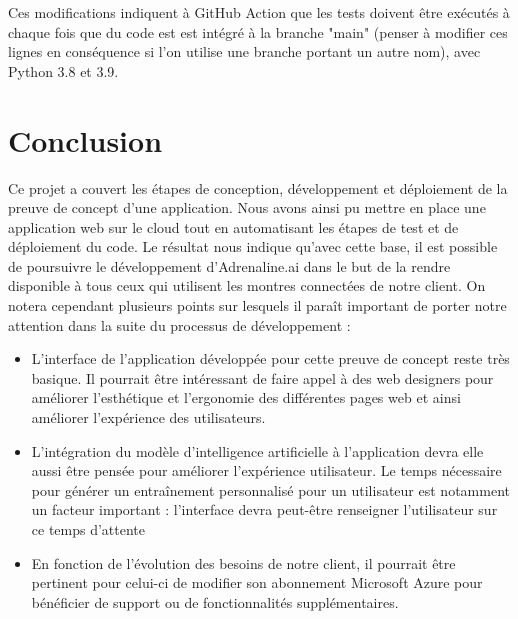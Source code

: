 \documentclass[french]{article}
\begin{document}
    Ces modifications indiquent à GitHub Action que les tests doivent être exécutés à chaque fois que du code est est intégré à la branche "main" (penser à modifier ces lignes en conséquence si l'on utilise une branche portant un autre nom), avec Python 3.8 et 3.9.




  

    \section*{Conclusion}
    Ce projet a couvert les étapes de conception, développement et déploiement de la preuve de concept d'une application. Nous avons ainsi pu mettre en place une application web sur le cloud tout en automatisant les étapes de test et de déploiement du code. Le résultat nous indique qu'avec cette base, il est possible de poursuivre le développement d'Adrenaline.ai dans le but de la rendre disponible à tous ceux qui utilisent les montres connectées de notre client. On notera cependant plusieurs points sur lesquels il paraît important de porter notre attention dans la suite du processus de développement :
    \begin{itemize}
        \item L'interface de l'application développée pour cette preuve de concept reste très basique. Il pourrait être intéressant de faire appel à des web designers pour améliorer l'esthétique et l'ergonomie des différentes pages web et ainsi améliorer l'expérience des utilisateurs.
        \item L'intégration du modèle d'intelligence artificielle à l'application devra elle aussi être pensée pour améliorer l'expérience utilisateur. Le temps nécessaire pour générer un entraînement personnalisé pour un utilisateur est notamment un facteur important : l'interface devra peut-être renseigner l'utilisateur sur ce temps d'attente
        \item En fonction de l'évolution des besoins de notre client, il pourrait être pertinent pour celui-ci de modifier son abonnement Microsoft Azure pour bénéficier de support ou de fonctionnalités supplémentaires.
    \end{itemize}
    
    


    
\end{document}
